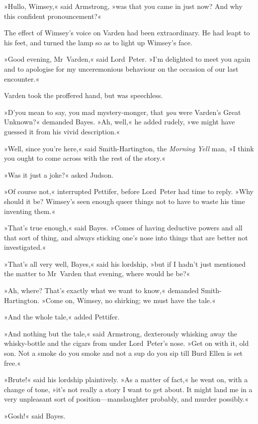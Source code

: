 »Hullo, Wimsey,« said Armstrong, »was that you came in just now? And why this confident pronouncement?«

The effect of Wimsey's voice on Varden had been extraordinary. He had leapt to his feet, and turned the lamp so as to light up Wimsey's face.

»Good evening, Mr~Varden,« said Lord~Peter. »I'm delighted to meet you again and to apologise for my unceremonious behaviour on the occasion of our last encounter.«

Varden took the proffered hand, but was speechless.

»D'you mean to say, you mad mystery-monger, that \textit{you} were Varden's Great Unknown?« demanded Bayes. »Ah, well,« he added rudely, »we might have guessed it from his vivid description.«

»Well, since you're here,« said Smith-Hartington, the \textit{Morning Yell} man, »I think you ought to come across with the rest of the story.«

»Was it just a joke?« asked Judson.

»Of course not,« interrupted Pettifer, before Lord~Peter had time to reply. »Why should it be? Wimsey's seen enough queer things not to have to waste his time inventing them.«

»That's true enough,« said Bayes. »Comes of having deductive powers and all that sort of thing, and always sticking one's nose into things that are better not investigated.«

»That's all very well, Bayes,« said his lordship, »but if I hadn't just mentioned the matter to Mr~Varden that evening, where would he be?«

»Ah, where? That's exactly what we want to know,« demanded Smith-Hartington. »Come on, Wimsey, no shirking; we must have the tale.«

»And the whole tale,« added Pettifer.

»And nothing but the tale,« said Armstrong, dexterously whisking away the whisky-bottle and the cigars from under Lord~Peter's nose. »Get on with it, old son. Not a smoke do you smoke and not a sup do you sip till Burd Ellen is set free.«

»Brute!« said his lordship plaintively. »As a matter of fact,« he went on, with a change of tone, »it's not really a story I want to get about. It might land me in a very unpleasant sort of position—manslaughter probably, and murder possibly.«

»Gosh!« said Bayes.

